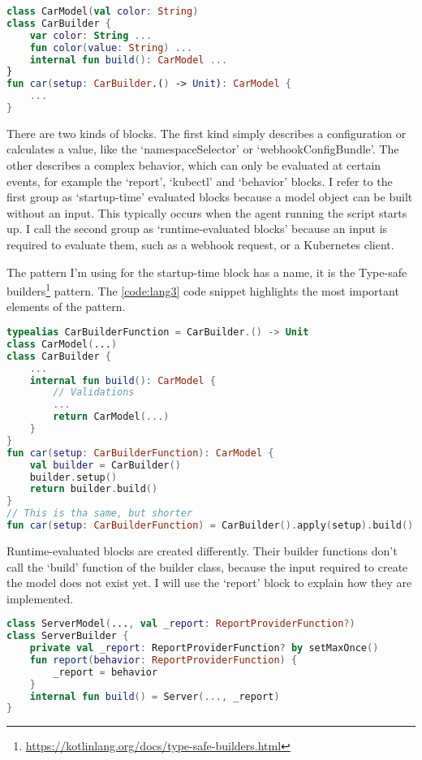 \begin{lstlisting}[caption={Basic idea behind a block},language=Kotlin,label=code:lang2]
class CarModel(val color: String)
class CarBuilder {
    var color: String ...
    fun color(value: String) ...
    internal fun build(): CarModel ...
}
fun car(setup: CarBuilder.() -> Unit): CarModel {
    ...
}
\end{lstlisting}

There are two kinds of blocks. The first kind simply describes a configuration or calculates a value, like the `namespaceSelector' or `webhookConfigBundle'. The other describes a complex behavior, which can only be evaluated at certain events, for example the `report', `kubectl' and `behavior' blocks. I refer to the first group as `startup-time' evaluated blocks because a model object can be built without an input. This typically occurs when the agent running the script starts up. I call the second group as `runtime-evaluated blocks' because an input is required to evaluate them, such as a webhook request, or a Kubernetes client.

The pattern I'm using for the startup-time block has a name, it is the Type-safe builders\footnote{\url{https://kotlinlang.org/docs/type-safe-builders.html}} pattern. The \ref{code:lang3} code snippet highlights the most important elements of the pattern.

\begin{lstlisting}[caption={Type-safe builders example},language=Kotlin,label=code:lang3]
typealias CarBuilderFunction = CarBuilder.() -> Unit
class CarModel(...)
class CarBuilder {
    ...
    internal fun build(): CarModel {
        // Validations
        ...
        return CarModel(...)
    }
}
fun car(setup: CarBuilderFunction): CarModel {
    val builder = CarBuilder()
    builder.setup()
    return builder.build()
}
// This is tha same, but shorter
fun car(setup: CarBuilderFunction) = CarBuilder().apply(setup).build()
\end{lstlisting}

Runtime-evaluated blocks are created differently. Their builder functions don't call the `build' function of the builder class, because the input required to create the model does not exist yet. I will use the `report' block to explain how they are implemented.

\begin{lstlisting}[caption={Builder function of the report block},language=Kotlin,label=code:runtimeblock0]
class ServerModel(..., val _report: ReportProviderFunction?)
class ServerBuilder {
    private val _report: ReportProviderFunction? by setMaxOnce()
    fun report(behavior: ReportProviderFunction) {
        _report = behavior
    }
    internal fun build() = Server(..., _report)
}
\end{lstlisting}

